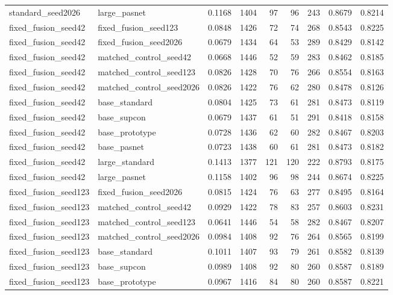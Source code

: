 \begin{tabular}{llrrrrrrr}
standard\_seed2026 & large\_pasnet & 0.1168 & 1404 & 97 & 96 & 243 & 0.8679 & 0.8214 \\
fixed\_fusion\_seed42 & fixed\_fusion\_seed123 & 0.0848 & 1426 & 72 & 74 & 268 & 0.8543 & 0.8225 \\
fixed\_fusion\_seed42 & fixed\_fusion\_seed2026 & 0.0679 & 1434 & 64 & 53 & 289 & 0.8429 & 0.8142 \\
fixed\_fusion\_seed42 & matched\_control\_seed42 & 0.0668 & 1446 & 52 & 59 & 283 & 0.8462 & 0.8185 \\
fixed\_fusion\_seed42 & matched\_control\_seed123 & 0.0826 & 1428 & 70 & 76 & 266 & 0.8554 & 0.8163 \\
fixed\_fusion\_seed42 & matched\_control\_seed2026 & 0.0826 & 1422 & 76 & 62 & 280 & 0.8478 & 0.8126 \\
fixed\_fusion\_seed42 & base\_standard & 0.0804 & 1425 & 73 & 61 & 281 & 0.8473 & 0.8119 \\
fixed\_fusion\_seed42 & base\_supcon & 0.0679 & 1437 & 61 & 51 & 291 & 0.8418 & 0.8158 \\
fixed\_fusion\_seed42 & base\_prototype & 0.0728 & 1436 & 62 & 60 & 282 & 0.8467 & 0.8203 \\
fixed\_fusion\_seed42 & base\_pasnet & 0.0723 & 1438 & 60 & 61 & 281 & 0.8473 & 0.8182 \\
fixed\_fusion\_seed42 & large\_standard & 0.1413 & 1377 & 121 & 120 & 222 & 0.8793 & 0.8175 \\
fixed\_fusion\_seed42 & large\_pasnet & 0.1158 & 1402 & 96 & 98 & 244 & 0.8674 & 0.8225 \\
fixed\_fusion\_seed123 & fixed\_fusion\_seed2026 & 0.0815 & 1424 & 76 & 63 & 277 & 0.8495 & 0.8164 \\
fixed\_fusion\_seed123 & matched\_control\_seed42 & 0.0929 & 1422 & 78 & 83 & 257 & 0.8603 & 0.8231 \\
fixed\_fusion\_seed123 & matched\_control\_seed123 & 0.0641 & 1446 & 54 & 58 & 282 & 0.8467 & 0.8207 \\
fixed\_fusion\_seed123 & matched\_control\_seed2026 & 0.0984 & 1408 & 92 & 76 & 264 & 0.8565 & 0.8199 \\
fixed\_fusion\_seed123 & base\_standard & 0.1011 & 1407 & 93 & 79 & 261 & 0.8582 & 0.8139 \\
fixed\_fusion\_seed123 & base\_supcon & 0.0989 & 1408 & 92 & 80 & 260 & 0.8587 & 0.8189 \\
fixed\_fusion\_seed123 & base\_prototype & 0.0967 & 1416 & 84 & 80 & 260 & 0.8587 & 0.8221 \\

\end{tabular}

